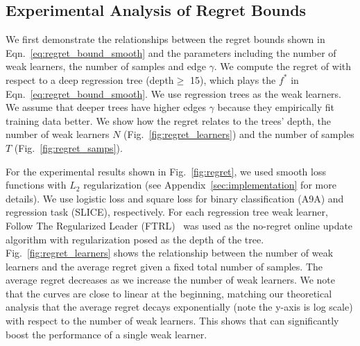 

\subsection{Experimental Analysis of Regret Bounds}
We first demonstrate the relationships between the regret bounds shown in Eqn.~\ref{eq:regret_bound_smooth} and the parameters including the number of weak learners, the number of samples and edge $\gamma$. We compute the regret of \algshort with respect to a deep regression tree (depth$\geq$ 15), which plays the $f^*$ in Eqn.~\ref{eq:regret_bound_smooth}. 
We use regression trees as the weak learners. We assume that deeper trees have higher edges $\gamma$ because they empirically fit training data better. We show how the regret relates to the trees' depth, the number of weak learners $N$ (Fig.~\ref{fig:regret_learners}) and the number of samples $T$ (Fig.~\ref{fig:regret_samps}). 


For the experimental results shown in Fig.~\ref{fig:regret}, we used smooth loss functions with $L_2$ regularization (see Appendix~\ref{sec:implementation} for more details). We use logistic loss and square loss for binary classification (A9A) and regression task (SLICE), respectively. For each regression tree weak learner, Follow The Regularized Leader (FTRL)~\citep{shalev2011online} was used as the no-regret online update algorithm with regularization posed as the depth of the tree. Fig.~\ref{fig:regret_learners} shows the relationship between the number of weak learners and the average regret given a fixed total number of samples. The average regret decreases as we increase the number of weak learners. We note that the curves are close to linear at the beginning, matching our theoretical analysis that the average regret decays exponentially (note the y-axis is log scale) with respect to the number of weak learners. This shows that \algshort can significantly boost the performance of a single weak learner.%

